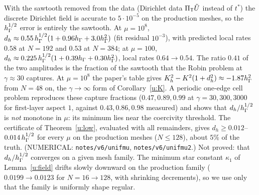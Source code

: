 \begin{remark}\label{u:rem}
With the sawtooth removed from the data (Dirichlet data $\Pi_{\mathsf T}\tilde U$ instead of $t^\ast$) the discrete Dirichlet field is accurate to $5\cdot10^{-5}$ on the production meshes, so the $h_\Gamma^{1/2}$ error is entirely the sawtooth. At $\mu=10^8$, $d_h\approx0.55\,h_\Gamma^{1/2}(1+0.96h_\Gamma+3.0h_\Gamma^2)$ (fit residual $10^{-3}$), with predicted local rates $0.58$ at $N=192$ and $0.53$ at $N=384$; at $\mu=100$, $d_h\approx0.225\,h_\Gamma^{1/2}(1+0.39h_\Gamma+0.30h_\Gamma^2)$, local rates $0.64\to0.54$. The ratio $0.41$ of the two amplitudes is the fraction of the sawtooth that the Robin problem at $\gamma\approx30$ captures. At $\mu=10^8$ the paper's table gives $K_h^2-K^2(1+d_h^2)\approx-1.87h_\Gamma^2$ from $N=48$ on, the $\gamma\to\infty$ form of Corollary~\ref{u:K}. A periodic one-edge cell problem reproduces these capture fractions ($0.47,0.89,0.99$ at $\gamma=30,300,3000$ for first-layer aspect $1$, against $0.43,0.86,0.98$ measured) and shows that $d_h/h_\Gamma^{1/2}$ is \emph{not} monotone in $\mu$: its minimum lies near the coercivity threshold. The certificate of Theorem~\ref{u:low}, evaluated with all remainders, gives $d_h\ge0.012$--$0.014\,h_\Gamma^{1/2}$ for every $\mu$ on the production meshes ($N\le128$), about $5\%$ of the truth. (NUMERICAL: \texttt{notes/v6/unifmu}, \texttt{notes/v6/unifmu2}.) Not proved: that $d_h/h_\Gamma^{1/2}$ converges on a given mesh family. The minimum star constant $\kappa_1$ of Lemma~\ref{u:field} drifts slowly downward on the production family ($0.0199\to0.0123$ for $N=16\to128$, with shrinking decrements), so we use only that the family is uniformly shape regular.
\end{remark}
